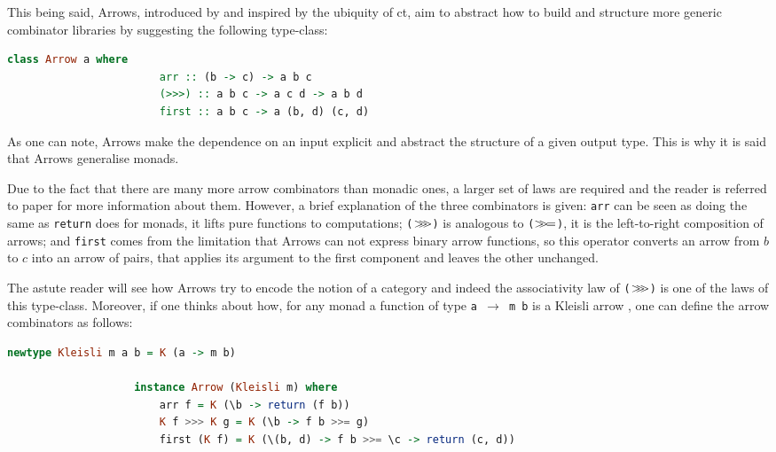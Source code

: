 \documentclass[
  oneside,
  11pt, a4paper,
  footinclude=true,
  headinclude=true,
  cleardoublepage=empty
]{scrbook}
\theoremstyle{definition}
\theoremstyle{definition}
\def\bind{\mathbin{{>\hskip-1ex>\hskip-.4ex=}}}
\def\bindA{\mathbin{{>\hskip-1ex>\hskip-1ex>}}}
\begin{document}
    This being said, Arrows, introduced by \cite{Hughes:2000:GMA:347238.347246} and inspired by the ubiquity of \gls{ct}, aim to abstract how to build and structure more generic combinator libraries by suggesting the following type-class:
    	        
                \begin{lstlisting}[language=Haskell, caption={Arrow type-class},captionpos=b]
                    class Arrow a where
                        arr :: (b -> c) -> a b c
                        (>>>) :: a b c -> a c d -> a b d
                        first :: a b c -> a (b, d) (c, d)
    	        \end{lstlisting}{}
    	       
    As one can note, Arrows make the dependence on an input explicit and abstract the structure of a given output type. This is why it is said that Arrows generalise monads.
    	       
    Due to the fact that there are many more arrow combinators than monadic ones, a larger set of laws are required and the reader is referred to \cite{Hughes:2000:GMA:347238.347246} paper for more information about them. However, a brief explanation of the three combinators is given: \texttt{arr} can be seen as doing the same as \texttt{return} does for monads, it lifts pure functions to computations; \texttt{($\bindA$)} is analogous to \texttt{($\bind$)}, it is the left-to-right composition of arrows; and \texttt{first} comes from the limitation that Arrows can not express binary arrow functions, so this operator converts an arrow from $b$ to $c$ into an arrow of pairs, that applies its argument to the first component and leaves the other unchanged.
    	       
    The astute reader will see how Arrows try to encode the notion of a category and indeed the associativity law of \texttt{($\bindA$)} is one of the laws of this type-class. Moreover, if one thinks about how, for any monad a function of type \texttt{a $\rightarrow$ m b} is a Kleisli arrow \citep{Awodey:2010:CT:2060081}, one can define the arrow combinators as follows:
    	        
                \begin{lstlisting}[mathescape, language=Haskell, caption={Arrow Kleisli type-class instance},captionpos=b]
                    newtype Kleisli m a b = K (a -> m b)
                
                    instance Arrow (Kleisli m) where
                        arr f = K (\b -> return (f b))
                        K f >>> K g = K (\b -> f b >>= g)
                        first (K f) = K (\(b, d) -> f b >>= \c -> return (c, d))
                \end{lstlisting}{}
                
\end{document}
